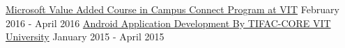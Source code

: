 \vspace{-0.2mm}
\begin{cventries}
    \vspace{-1.3mm}
    \begin{justify}
    {\small
    \href{https://shubhammathur.me/Certificates/Microsoft.jpg}
    {Microsoft Value Added Course in Campus Connect Program at VIT}
    \hspace{3.4cm}
    \footnotesize
    {February 2016 - April 2016}
    }
    {\newline
    \small
    \href{https://shubhammathur.me/Certificates/TIFAC.jpg}
    {Android Application Development By TIFAC-CORE VIT University}
    \footnotesize
    \hspace{3.35cm}
    {January 2015 - April 2015}
    }
    \end{justify}
\end{cventries}